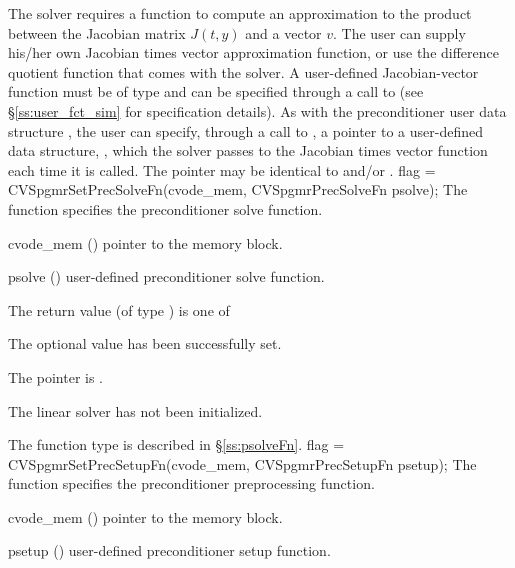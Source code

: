 The 
{\cvspgmr} solver requires a function to compute an approximation to the
product between the Jacobian matrix $J(t,y)$ and a vector $v$.
The user can supply his/her own Jacobian times vector approximation function, 
or use the difference quotient function  
that comes with the {\cvspgmr} solver.
A user-defined Jacobian-vector function must be of type  and 
can be specified through a call to  
(see \S\ref{ss:user_fct_sim} for specification details).
As with the preconditioner user data structure , 
the user can specify, through a call to , a pointer to a 
user-defined data structure, , which
the {\cvspgmr} solver passes to the Jacobian times vector function 
each time it is called.  
The pointer  may be identical to  and/or .
{
  flag = CVSpgmrSetPrecSolveFn(cvode\_mem, CVSpgmrPrecSolveFn psolve);
}
{
  The function  specifies the preconditioner
  solve function.
}
{
  \begin{args}
  \item[cvode\_mem] ()
    pointer to the {\cvode} memory block.
  \item[psolve] ()
    user-defined preconditioner solve function.
  \end{args}
}
{
  The return value  (of type ) is one of
  \begin{args}
  \item[\Id{CVSPGMR\_SUCCESS}] 
    The optional value has been successfully set.
  \item[\Id{CVSPGMR\_MEM\_NULL}]
    The  pointer is .
  \item[\Id{CVSPGMR\_LMEM\_NULL}]
    The {\cvspgmr} linear solver has not been initialized.
  \end{args}
}
{
   The function type  is described in \S\ref{ss:psolveFn}.
}
{
  flag = CVSpgmrSetPrecSetupFn(cvode\_mem, CVSpgmrPrecSetupFn psetup);
}
{
  The function  specifies the preconditioner
  preprocessing function.
}
{
  \begin{args}
  \item[cvode\_mem] ()
    pointer to the {\cvode} memory block.
  \item[psetup] ()
    user-defined preconditioner setup function.
  \end{args}
}
